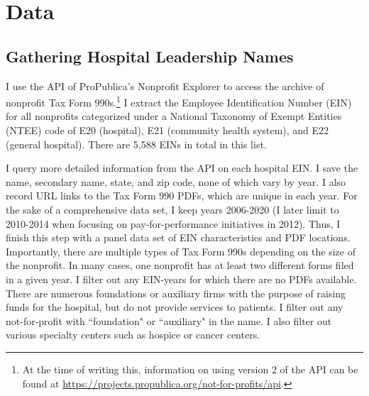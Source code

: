 \documentclass[12pt]{article}
\begin{document}
    

	
	\newpage

    \singlespacing

    \printbibliography

    \onehalfspacing

\appendix
\setcounter{table}{0}
\renewcommand{\thetable}{A.\arabic{table}}
\renewcommand{\thefigure}{A.\arabic{figure}}

\newpage

\section{Data}\label{appendixdata}

\subsection{Gathering Hospital Leadership Names}

I use the API of ProPublica's Nonprofit Explorer to access the archive of nonprofit Tax Form 990s.\footnote{At the time of writing this, information on using version 2 of the API can be found at \href{https://projects.propublica.org/not-for-profits/api}{https://projects.propublica.org/not-for-profits/api}.} I extract the Employee Identification Number (EIN) for all nonprofits categorized under a National Taxonomy of Exempt Entities (NTEE) code of E20 (hospital), E21 (community health system), and E22 (general hospital). There are 5,588 EINs in total in this list. 

I query more detailed information from the API on each hospital EIN. I save the name, secondary name, state, and zip code, none of which vary by year. I also record URL links to the Tax Form 990 PDFs, which are unique in each year. For the sake of a comprehensive data set, I keep years 2006-2020 (I later limit to 2010-2014 when focusing on pay-for-performance initiatives in 2012). Thus, I finish this step with a panel data set of EIN characteristics and PDF locations. Importantly, there are multiple types of Tax Form 990s depending on the size of the nonprofit. In many cases, one nonprofit has at least two different forms filed in a given year. I filter out any EIN-years for which there are no PDFs available. There are numerous foundations or auxiliary firms with the purpose of raising funds for the hospital, but do not provide services to patients. I filter out any not-for-profit with ``foundation" or ``auxiliary" in the name. I also filter out various specialty centers such as hospice or cancer centers.  
\end{document}
